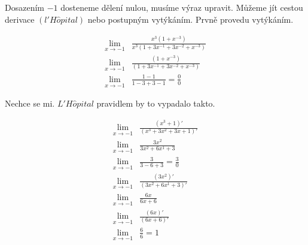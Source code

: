 
Dosazením $-1$ dosteneme dělení nulou, musíme výraz upravit.
Můžeme jít cestou derivace $(l'H\hat{o}pital)$ nebo postupným vytýkáním.
Prvně provedu vytýkáním.

\begin{align}
	\lim_{x \rightarrow -1}& \frac{x^3(1 + x^{-3})}{x^3(1 + 3x^{-1} + 3x^{-2} + x^{-3})} \\
	\lim_{x \rightarrow -1}& \frac{(1 + x^{-3})}{(1 + 3x^{-1} + 3x^{-2} + x^{-3})} \\
	\lim_{x \rightarrow -1}& \frac{1 - 1}{1 - 3 + 3 - 1} 
	= \frac{0}{0} 
\end{align}

Nechce se mi.
$L'H\hat{o}pital$ pravidlem by to vypadalo takto.

\begin{align}
	\lim_{x \rightarrow -1}& \frac{(x^3 + 1)'}{(x^3 + 3x^2 + 3x + 1)'} \\
	\lim_{x \rightarrow -1}& \frac{3x^2}{3x^2 + 6x^1 + 3} \\
	\lim_{x \rightarrow -1}& \frac{3}{3 -6 + 3} = \frac{3}{0}\\
	\lim_{x \rightarrow -1}& \frac{(3x^2)'}{(3x^2 + 6x^1 + 3)'} \\
	\lim_{x \rightarrow -1}& \frac{6x}{6x + 6} \\
	\lim_{x \rightarrow -1}& \frac{(6x)'}{(6x + 6)'} \\
	\lim_{x \rightarrow -1}& \frac{6}{6} = 1 
\end{align}
